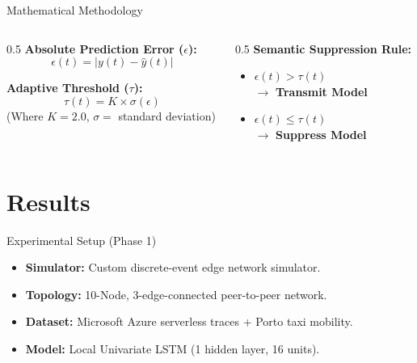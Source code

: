 \documentclass[aspectratio=169]{beamer}
\begin{document}
\begin{frame}{Mathematical Methodology}
    \begin{columns}
        \begin{column}{0.5\textwidth}
            \textbf{Absolute Prediction Error ($\epsilon$):}
            \begin{equation}
                \epsilon(t) = | y(t) - \hat{y}(t) |
            \end{equation}
            \vspace{0.3cm}
            
            \textbf{Adaptive Threshold ($\tau$):}
            \begin{equation}
                \tau(t) = K \times \sigma(\epsilon)
            \end{equation}
            (Where $K = 2.0$, $\sigma =$ standard deviation)
        \end{column}
        \begin{column}{0.5\textwidth}
            \textbf{Semantic Suppression Rule:}
            \vspace{0.3cm}
            \begin{itemize}
                \item $\epsilon(t) > \tau(t)$ \\
                $\rightarrow$ \textbf{Transmit Model}
                \vspace{0.3cm}
                \item $\epsilon(t) \leq \tau(t)$ \\
                $\rightarrow$ \textbf{Suppress Model}
            \end{itemize}
        \end{column}
    \end{columns}
\end{frame}

\section{Results}
\begin{frame}{Experimental Setup (Phase 1)}
    \begin{itemize}
        \item \textbf{Simulator:} Custom discrete-event edge network simulator.
        \item \textbf{Topology:} 10-Node, 3-edge-connected peer-to-peer network.
        \item \textbf{Dataset:} Microsoft Azure serverless traces + Porto taxi mobility.
        \item \textbf{Model:} Local Univariate LSTM (1 hidden layer, 16 units).
    \end{itemize}
\end{frame}
\end{document}
